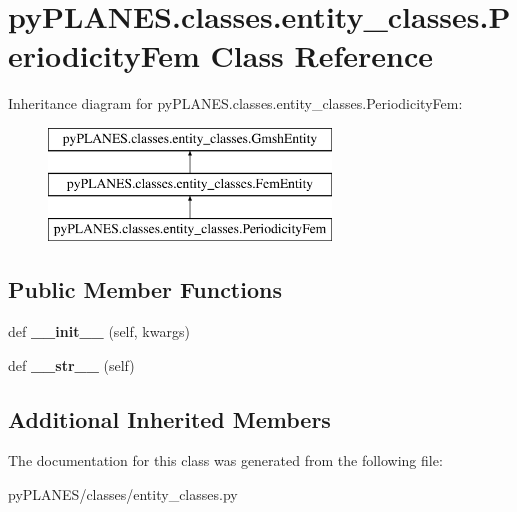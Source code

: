 \hypertarget{classpy_p_l_a_n_e_s_1_1classes_1_1entity__classes_1_1_periodicity_fem}{}\section{py\+P\+L\+A\+N\+E\+S.\+classes.\+entity\+\_\+classes.\+Periodicity\+Fem Class Reference}
\label{classpy_p_l_a_n_e_s_1_1classes_1_1entity__classes_1_1_periodicity_fem}
Inheritance diagram for py\+P\+L\+A\+N\+E\+S.\+classes.\+entity\+\_\+classes.\+Periodicity\+Fem\+:\begin{figure}[H]
\begin{center}
\leavevmode
\includegraphics[height=3.000000cm]{classpy_p_l_a_n_e_s_1_1classes_1_1entity__classes_1_1_periodicity_fem}
\end{center}
\end{figure}
\subsection*{Public Member Functions}
\begin{DoxyCompactItemize}
\item 
\mbox{\label{classpy_p_l_a_n_e_s_1_1classes_1_1entity__classes_1_1_periodicity_fem_af289f6608fc5fe2b43ef14606e169837}} 
def {\bfseries \+\_\+\+\_\+init\+\_\+\+\_\+} (self, kwargs)
\item 
\mbox{\label{classpy_p_l_a_n_e_s_1_1classes_1_1entity__classes_1_1_periodicity_fem_a13606781660f74bcf8be1985d78c2843}} 
def {\bfseries \+\_\+\+\_\+str\+\_\+\+\_\+} (self)
\end{DoxyCompactItemize}
\subsection*{Additional Inherited Members}


The documentation for this class was generated from the following file\+:\begin{DoxyCompactItemize}
\item 
py\+P\+L\+A\+N\+E\+S/classes/entity\+\_\+classes.\+py\end{DoxyCompactItemize}
